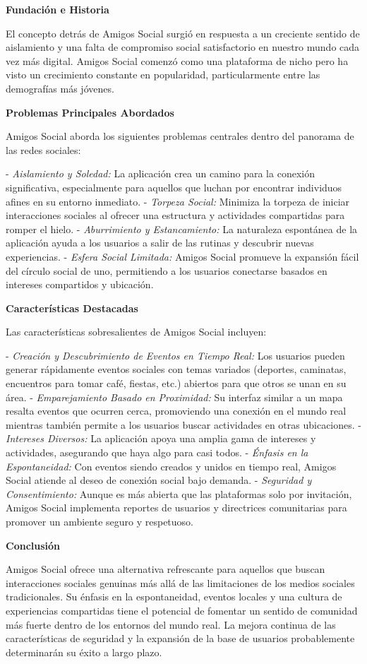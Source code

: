 \textbf{Fundación e Historia}

El concepto detrás de Amigos Social surgió en respuesta a un creciente sentido de aislamiento y una falta de compromiso social satisfactorio en nuestro mundo cada vez más digital. Amigos Social comenzó como una plataforma de nicho pero ha visto un crecimiento constante en popularidad, particularmente entre las demografías más jóvenes.

\textbf{Problemas Principales Abordados}

Amigos Social aborda los siguientes problemas centrales dentro del panorama de las redes sociales:

- \textit{Aislamiento y Soledad:} La aplicación crea un camino para la conexión significativa, especialmente para aquellos que luchan por encontrar individuos afines en su entorno inmediato.
- \textit{Torpeza Social:} Minimiza la torpeza de iniciar interacciones sociales al ofrecer una estructura y actividades compartidas para romper el hielo.
- \textit{Aburrimiento y Estancamiento:} La naturaleza espontánea de la aplicación ayuda a los usuarios a salir de las rutinas y descubrir nuevas experiencias.
- \textit{Esfera Social Limitada:} Amigos Social promueve la expansión fácil del círculo social de uno, permitiendo a los usuarios conectarse basados en intereses compartidos y ubicación.

\textbf{Características Destacadas}

Las características sobresalientes de Amigos Social incluyen:

- \textit{Creación y Descubrimiento de Eventos en Tiempo Real:} Los usuarios pueden generar rápidamente eventos sociales con temas variados (deportes, caminatas, encuentros para tomar café, fiestas, etc.) abiertos para que otros se unan en su área.
- \textit{Emparejamiento Basado en Proximidad:} Su interfaz similar a un mapa resalta eventos que ocurren cerca, promoviendo una conexión en el mundo real mientras también permite a los usuarios buscar actividades en otras ubicaciones.
- \textit{Intereses Diversos:} La aplicación apoya una amplia gama de intereses y actividades, asegurando que haya algo para casi todos.
- \textit{Énfasis en la Espontaneidad:} Con eventos siendo creados y unidos en tiempo real, Amigos Social atiende al deseo de conexión social bajo demanda.
- \textit{Seguridad y Consentimiento:} Aunque es más abierta que las plataformas solo por invitación, Amigos Social implementa reportes de usuarios y directrices comunitarias para promover un ambiente seguro y respetuoso.

\textbf{Conclusión}

Amigos Social ofrece una alternativa refrescante para aquellos que buscan interacciones sociales genuinas más allá de las limitaciones de los medios sociales tradicionales. Su énfasis en la espontaneidad, eventos locales y una cultura de experiencias compartidas tiene el potencial de fomentar un sentido de comunidad más fuerte dentro de los entornos del mundo real. La mejora continua de las características de seguridad y la expansión de la base de usuarios probablemente determinarán su éxito a largo plazo.
